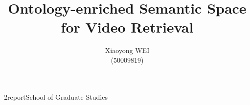 \documentclass[12pt]{report}
\begin{document}

\department2report{School of Graduate Studies}


\title{Ontology-enriched Semantic Space\\ for Video Retrieval}
\author{Xiaoyong WEI \\(50009819)}







    \beforepreface

    \afterpreface



%



%


\graphicspath{{figures/}}





%









\appendix

\end{document}
